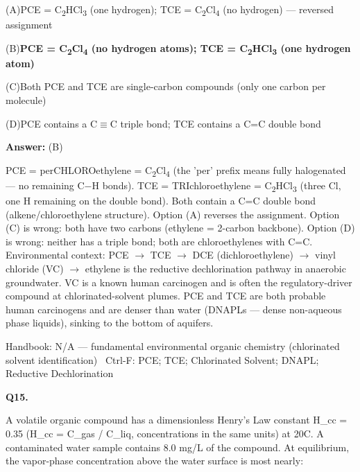 \documentclass[11pt]{article}
\newcommand{\correct}[1]{\textbf{#1}\;{\color{accent}$\checkmark$}}
\newcommand{\optline}[2]{\par\noindent\hspace{1.2em}(#1)\hspace{0.6em}#2}
\begin{document}
\optline{A}{PCE = C\textsubscript{2}HCl\textsubscript{3} (one hydrogen); TCE = C\textsubscript{2}Cl\textsubscript{4} (no hydrogen) --- reversed assignment}
\optline{B}{\correct{PCE = C\textsubscript{2}Cl\textsubscript{4} (no hydrogen atoms); TCE = C\textsubscript{2}HCl\textsubscript{3} (one hydrogen atom)}}
\optline{C}{Both PCE and TCE are single-carbon compounds (only one carbon per molecule)}
\optline{D}{PCE contains a C$\equiv$C triple bond; TCE contains a C=C double bond}
\par\vspace{3pt}
\vspace{2pt}\par\noindent\colorbox{boxbg}{\parbox{\dimexpr\linewidth-2\fboxsep\relax}{%
\vspace{2pt}\textbf{Answer:} (B)\par\vspace{2pt}
{\small PCE = perCHLOROethylene = C\textsubscript{2}Cl\textsubscript{4} (the 'per' prefix means fully halogenated --- no remaining C$-$H bonds). TCE = TRIchloroethylene = C\textsubscript{2}HCl\textsubscript{3} (three Cl, one H remaining on the double bond). Both contain a C=C double bond (alkene/chloroethylene structure). Option (A) reverses the assignment. Option (C) is wrong: both have two carbons (ethylene = 2-carbon backbone). Option (D) is wrong: neither has a triple bond; both are chloroethylenes with C=C. Environmental context: PCE $\rightarrow$ TCE $\rightarrow$ DCE (dichloroethylene) $\rightarrow$ vinyl chloride (VC) $\rightarrow$ ethylene is the reductive dechlorination pathway in anaerobic groundwater. VC is a known human carcinogen and is often the regulatory-driver compound at chlorinated-solvent plumes. PCE and TCE are both probable human carcinogens and are denser than water (DNAPLs --- dense non-aqueous phase liquids), sinking to the bottom of aquifers.}\par\vspace{2pt}
{\footnotesize\color{soft}Handbook: N/A --- fundamental environmental organic chemistry (chlorinated solvent identification) \textbullet\ Ctrl-F: PCE; TCE; Chlorinated Solvent; DNAPL; Reductive Dechlorination}\vspace{2pt}
}}
\vspace{9pt}
\filbreak
\textbf{\color{accent}Q15.}\par\vspace{2pt}
A volatile organic compound has a dimensionless Henry's Law constant H\_cc = 0.35 (H\_cc = C\_gas / C\_liq, concentrations in the same units) at 20\textdegree{}C. A contaminated water sample contains 8.0 mg/L of the compound. At equilibrium, the vapor-phase concentration above the water surface is most nearly:\par\vspace{3pt}
\end{document}
